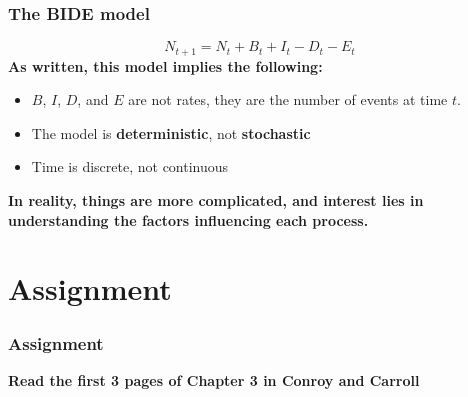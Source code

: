 \documentclass[color=usenames,dvipsnames]{beamer}\usepackage[]{graphicx}\usepackage[]{color}
\begin{document}
\begin{frame}
  \frametitle{The BIDE model}
  \huge
  \[
  N_{t+1} = N_t + B_t + I_t - D_t - E_t
  \]
  \large
  \vfill
  {\bf As written, this model implies the following:}
  \begin{itemize}%
    \item<1-> $B$, $I$, $D$, and $E$ are not rates, they
      are the number of events at time $t$.
    \item The model is {\bf deterministic}, not {\bf stochastic}
    \item Time is discrete, not continuous
  \end{itemize}
  \vspace{0.5cm}
  \pause
  \bf In reality, things are more complicated, and interest lies in
  understanding the factors influencing each process.\par
\end{frame}



\section{Assignment}


\begin{frame}
  \frametitle{Assignment}
  \Large
  \bf
  Read the first 3 pages of Chapter 3 in Conroy and Carroll \\
%
\end{frame}
\end{document}
